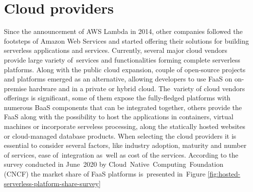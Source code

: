 \section{Cloud providers} \label{chapter:serverless-service-providers}

Since the announcement of AWS Lambda in 2014, other companies followed the footsteps of Amazon Web Services and started offering their solutions for building serverless applications and services. Currently, several major cloud vendors provide large variety of~services and functionalities forming complete serverless platforms. Along with the public cloud expansion, couple of open-source projects and platforms emerged as an alternative, allowing developers to use FaaS on on-premise hardware and in a private or hybrid cloud. The~variety of cloud vendors offerings is significant, some of them expose the fully-fledged platforms with numerous BaaS components that can be integrated together, others provide the FaaS along with the possibility to host the applications in containers, virtual machines or incorporate serveless processing, along the statically hosted websites or cloud-managed database products. When selecting the cloud providers it is essential to consider several factors, like industry adoption, maturity and number of services, ease of~integration as~well as cost of the services. According to the survey conducted in June~2020 by Cloud~Native~Computing~Foundation (CNCF) \cite{CNCFServerlessSurvey2020} the market share of FaaS platforms is~presented in~Figure \ref{fig:hosted-serverless-platform-share-survey}

